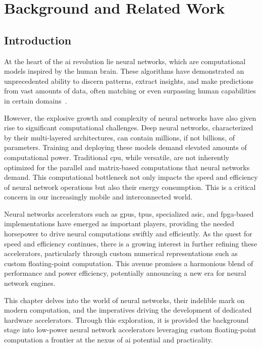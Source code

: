\chapter{Background and Related Work}\label{chap.background}
\minitoc
\section{Introduction}
At the heart of the \gls{ai} revolution lie neural networks, which are computational models inspired by the human brain. These algorithms have demonstrated an unprecedented ability to discern patterns, extract insights, and make predictions from vast amounts of data, often matching or even surpassing human capabilities in certain domains~\cite{silver2016mastering, gulshan2016development, lake2015human, xiong2016achieving, brown2020language}.

However, the explosive growth and complexity of neural networks have also given rise to significant computational challenges. Deep neural networks, characterized by their multi-layered architectures, can contain millions, if not billions, of parameters. Training and deploying these models demand elevated amounts of computational power. Traditional \gls{cpu}, while versatile, are not inherently optimized for the parallel and matrix-based computations that neural networks demand. This computational bottleneck not only impacts the speed and efficiency of neural network operations but also their energy consumption. This is a critical concern in our increasingly mobile and interconnected world.

Neural networks accelerators such as \glspl{gpu}, \glspl{tpu}, specialized \gls{asic}, and \gls{fpga}-based implementations have emerged as important players, providing the needed horsepower to drive neural computations swiftly and efficiently. As the quest for speed and efficiency continues, there is a growing interest in further refining these accelerators, particularly through custom numerical representations such as custom floating-point computation. This avenue promises a harmonious blend of performance and power efficiency, potentially announcing a new era for neural network engines.

This chapter delves into the world of neural networks, their indelible mark on modern computation, and the imperatives driving the development of dedicated hardware accelerators. Through this exploration, it is provided the background stage into low-power neural network accelerators leveraging custom floating-point computation a frontier at the nexus of \gls{ai} potential and practicality.

